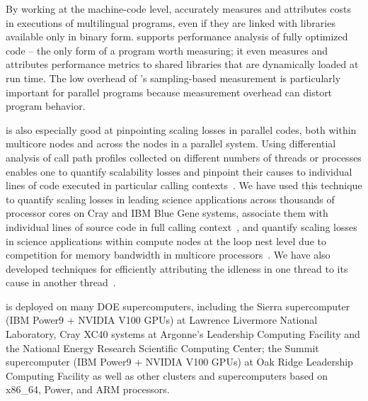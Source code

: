 \documentclass[11pt,letterpaper]{report}
\begin{document}
By working at the machine-code level, \HPCToolkit{} accurately measures and attributes costs in executions of multilingual programs, even if they are linked with libraries available only in binary form.
\HPCToolkit{} supports performance analysis of fully optimized code -- the only form of a program worth measuring; it even measures and attributes performance metrics to shared libraries that are dynamically loaded at run time.
The low overhead of \HPCToolkit{}'s sampling-based measurement is particularly important for parallel programs because measurement overhead can distort program behavior.

\HPCToolkit{} is also especially good at pinpointing scaling losses in parallel codes, both within multicore nodes and across the nodes in a parallel system.
Using differential analysis of call path profiles collected on different numbers of threads or processes enables one to quantify scalability losses and pinpoint their causes to individual lines of code executed in particular calling contexts~\cite{Coarfa-MC:2007:ICS-scalability}.
We have used this technique to quantify scaling losses in leading science applications across thousands of processor cores on Cray and IBM Blue Gene systems, associate them with individual lines of source code in full calling context~\cite{Tallent-MC-etal:2009:SC-hpctoolkit-petascale,Tallent-MC-etal:2010:SC-hpctoolkit-load-imbalance}, and quantify scaling losses in science applications within compute nodes at the loop nest level due to competition for memory bandwidth in multicore processors~\cite{Tallent-etal:2008:SciDAC-hpctoolkit}.
We have also developed techniques for efficiently attributing the idleness in one thread to its cause in another thread~\cite{Tallent-MC:2009:PPoPP-hpctoolkit-work-stealing,Tallent-MC-Porterfield:2010:PPoPP-hpctoolkit-lock-contention}.

\HPCToolkit{} is deployed on many DOE supercomputers, including
the Sierra supercomputer (IBM Power9 + NVIDIA V100 GPUs) at Lawrence Livermore National Laboratory,
Cray XC40 systems at Argonne's Leadership Computing Facility and the National Energy
Research Scientific Computing Center; the Summit supercomputer (IBM Power9 + NVIDIA V100 GPUs) at Oak Ridge Leadership Computing Facility
as well as other clusters and supercomputers based on x86\_64, Power, and ARM processors.

\end{document}
